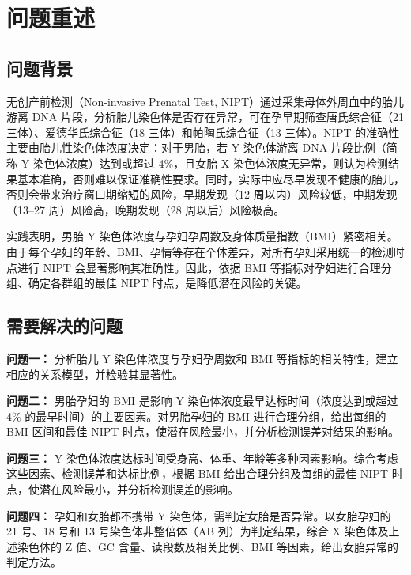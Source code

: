 \section{问题重述}

\subsection{问题背景}

无创产前检测（Non-invasive Prenatal Test, NIPT）通过采集母体外周血中的胎儿游离 DNA 片段\cite{ref1}，分析胎儿染色体是否存在异常，可在孕早期筛查唐氏综合征（21 三体）、爱德华氏综合征（18 三体）和帕陶氏综合征（13 三体）\cite{ref5}。NIPT 的准确性主要由胎儿性染色体浓度决定：对于男胎，若 Y 染色体游离 DNA 片段比例（简称 Y 染色体浓度）达到或超过 4\%，且女胎 X 染色体浓度无异常，则认为检测结果基本准确，否则难以保证准确性要求。同时，实际中应尽早发现不健康的胎儿，否则会带来治疗窗口期缩短的风险，早期发现（12 周以内）风险较低，中期发现（13--27 周）风险高，晚期发现（28 周以后）风险极高。

实践表明，男胎 Y 染色体浓度与孕妇孕周数及身体质量指数（BMI）紧密相关。由于每个孕妇的年龄、BMI、孕情等存在个体差异，对所有孕妇采用统一的检测时点进行 NIPT 会显著影响其准确性。因此，依据 BMI 等指标对孕妇进行合理分组、确定各群组的最佳 NIPT 时点，是降低潜在风险的关键。

\subsection{需要解决的问题}

\textbf{问题一：} 分析胎儿 Y 染色体浓度与孕妇孕周数和 BMI 等指标的相关特性，建立相应的关系模型，并检验其显著性。

\textbf{问题二：} 男胎孕妇的 BMI 是影响 Y 染色体浓度最早达标时间（浓度达到或超过 4\% 的最早时间）的主要因素。对男胎孕妇的 BMI 进行合理分组，给出每组的 BMI 区间和最佳 NIPT 时点，使潜在风险最小，并分析检测误差对结果的影响。

\textbf{问题三：} Y 染色体浓度达标时间受身高、体重、年龄等多种因素影响。综合考虑这些因素、检测误差和达标比例，根据 BMI 给出合理分组及每组的最佳 NIPT 时点，使潜在风险最小，并分析检测误差的影响。

\textbf{问题四：} 孕妇和女胎都不携带 Y 染色体，需判定女胎是否异常。以女胎孕妇的 21 号、18 号和 13 号染色体非整倍体（AB 列）为判定结果，综合 X 染色体及上述染色体的 Z 值、GC 含量、读段数及相关比例、BMI 等因素，给出女胎异常的判定方法。
